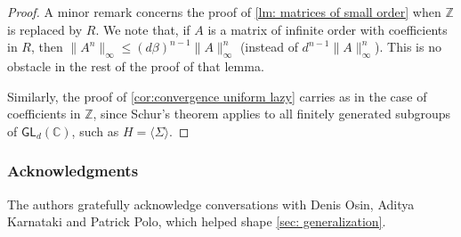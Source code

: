 \documentclass{article}
\def\C{\mathbb{C}}
\def\Z{\mathbb{Z}}
\def\GL{\textsf{GL}}
\theoremstyle{plain}
\theoremstyle{definition}
\begin{document}
\begin{proof}
A minor remark concerns the proof of \cref{lm: matrices of small order} when $\Z$ is replaced by $R$. We note that, if $A$ is a matrix of infinite order with coefficients in $R$, then $\|A^n\|_\infty \le (d\beta)^{n-1}\|A\|_\infty^n$ (instead of $d^{n-1}\|A\|_\infty^n$). This is no obstacle in the rest of the proof of that lemma.

Similarly, the proof of \cref{cor:convergence uniform lazy} carries as in the case of coefficients in $\Z$, since Schur's theorem applies to all finitely generated subgroups of $\GL_d(\C)$, such as $H = \langle\Sigma\rangle$.
%
\end{proof}


\subsubsection*{Acknowledgments}
%
The authors gratefully acknowledge conversations with Denis Osin, Aditya Karnataki and Patrick Polo, which helped shape \cref{sec: generalization}.

\end{document}
